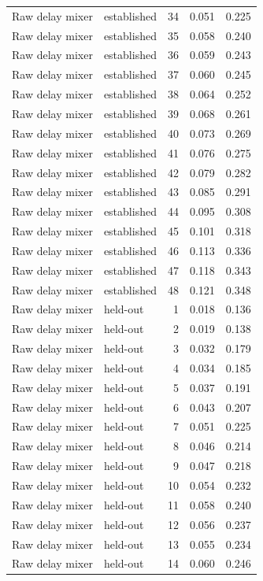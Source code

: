 \begin{tabular}{llrrr}
Raw delay mixer & established & 34 & 0.051 & 0.225 \\
Raw delay mixer & established & 35 & 0.058 & 0.240 \\
Raw delay mixer & established & 36 & 0.059 & 0.243 \\
Raw delay mixer & established & 37 & 0.060 & 0.245 \\
Raw delay mixer & established & 38 & 0.064 & 0.252 \\
Raw delay mixer & established & 39 & 0.068 & 0.261 \\
Raw delay mixer & established & 40 & 0.073 & 0.269 \\
Raw delay mixer & established & 41 & 0.076 & 0.275 \\
Raw delay mixer & established & 42 & 0.079 & 0.282 \\
Raw delay mixer & established & 43 & 0.085 & 0.291 \\
Raw delay mixer & established & 44 & 0.095 & 0.308 \\
Raw delay mixer & established & 45 & 0.101 & 0.318 \\
Raw delay mixer & established & 46 & 0.113 & 0.336 \\
Raw delay mixer & established & 47 & 0.118 & 0.343 \\
Raw delay mixer & established & 48 & 0.121 & 0.348 \\
Raw delay mixer & held-out & 1 & 0.018 & 0.136 \\
Raw delay mixer & held-out & 2 & 0.019 & 0.138 \\
Raw delay mixer & held-out & 3 & 0.032 & 0.179 \\
Raw delay mixer & held-out & 4 & 0.034 & 0.185 \\
Raw delay mixer & held-out & 5 & 0.037 & 0.191 \\
Raw delay mixer & held-out & 6 & 0.043 & 0.207 \\
Raw delay mixer & held-out & 7 & 0.051 & 0.225 \\
Raw delay mixer & held-out & 8 & 0.046 & 0.214 \\
Raw delay mixer & held-out & 9 & 0.047 & 0.218 \\
Raw delay mixer & held-out & 10 & 0.054 & 0.232 \\
Raw delay mixer & held-out & 11 & 0.058 & 0.240 \\
Raw delay mixer & held-out & 12 & 0.056 & 0.237 \\
Raw delay mixer & held-out & 13 & 0.055 & 0.234 \\
Raw delay mixer & held-out & 14 & 0.060 & 0.246 \\

\end{tabular}
